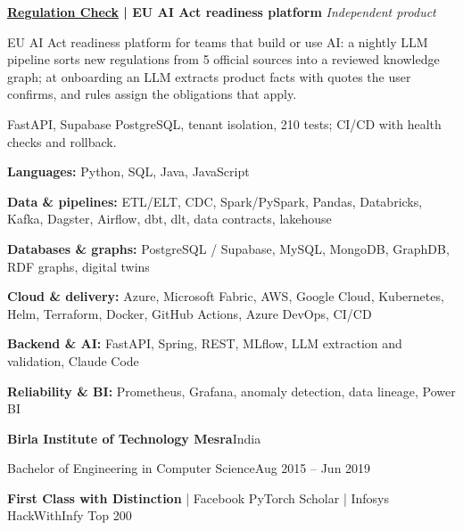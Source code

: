 \documentclass[11pt,a4paper]{article}
\begin{document}
\textbf{\href{https://regulationcheck.com/}{Regulation Check} | EU AI Act readiness platform}\hfill
\textit{Independent product}\par
\begin{cvitems}
  \item EU AI Act readiness platform for teams that build or use AI: a nightly LLM pipeline sorts new regulations from 5 official sources into a reviewed knowledge graph; at onboarding an LLM extracts product facts with quotes the user confirms, and rules assign the obligations that apply.
  \item FastAPI, Supabase PostgreSQL, tenant isolation, 210 tests; CI/CD with health checks and rollback.
\end{cvitems}

{\small
\textbf{Languages:} Python, SQL, Java, JavaScript\par
\textbf{Data \& pipelines:} ETL/ELT, CDC, Spark/PySpark, Pandas, Databricks, Kafka, Dagster, Airflow, dbt, dlt, data contracts, lakehouse\par
\textbf{Databases \& graphs:} PostgreSQL / Supabase, MySQL, MongoDB, GraphDB, RDF graphs, digital twins\par
\textbf{Cloud \& delivery:} Azure, Microsoft Fabric, AWS, Google Cloud, Kubernetes, Helm, Terraform, Docker, GitHub Actions, Azure DevOps, CI/CD\par
\textbf{Backend \& AI:} FastAPI, Spring, REST, MLflow, LLM extraction and validation, Claude Code\par
\textbf{Reliability \& BI:} Prometheus, Grafana, anomaly detection, data lineage, Power BI\par
}
\textbf{Birla Institute of Technology Mesra}\hfill India\par
Bachelor of Engineering in Computer Science\hfill Aug 2015 – Jun 2019\par
{\small\textbf{First Class with Distinction} | Facebook PyTorch Scholar | Infosys HackWithInfy Top 200}
\end{document}

